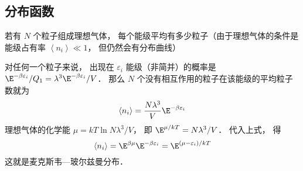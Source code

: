 \subsection{分布函数}
若有 $N$ 个粒子组成理想气体， 每个能级平均有多少粒子（由于理想气体的条件是能级占有率 $\left\langle {{n_i}} \right\rangle \ll 1$，  但仍然会有分布曲线）

对任何一个粒子来说， 出现在 ${\varepsilon_i}$ 能级（非简并）的概率是 ${{{\E^{ - \beta {\varepsilon_i}}}}}/{{{Q_1}}} = {{{\lambda ^3}}}{\E^{ - \beta {\varepsilon_i}}}/{V}$．  那么 $N$ 个没有相互作用的粒子在该能级的平均粒子数就为
\begin{equation}
\left\langle {n_i} \right\rangle  = \frac{N{\lambda ^3}}{V}{\E^{ - \beta {\varepsilon_i}}}
\end{equation}
理想气体的化学能 $\mu  = kT\ln {{N{\lambda ^3}}}/{V}$，  即 ${\E^{\mu/kT}} = {{N{\lambda ^3}}}/{V}$．  代入上式， 得
\begin{equation}
\left\langle {n_i} \right\rangle  = {\E^{\beta \mu }}{\E^{ - \beta {\varepsilon_i}}} = {\E^{(\mu - \varepsilon_i)/kT}}
\end{equation}
这就是麦克斯韦—玻尔兹曼分布．

